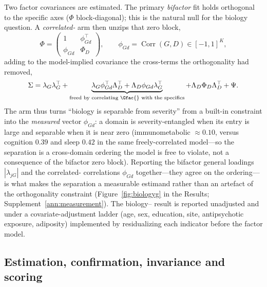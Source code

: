 Two factor covariances are estimated. The primary \emph{bifactor} fit holds \Gfac{}
orthogonal to the specific axes ($\Phi$ block-diagonal); this is the natural null for the
biology question. A \emph{correlated-\Gfac{}} arm then unzips that zero block,
\begin{equation}
  \Phi=\begin{pmatrix}1 & \phi_{Gd}^{\top}\\[2pt] \phi_{Gd} & \Phi_D\end{pmatrix},
  \qquad \phi_{Gd}=\operatorname{Corr}(G,D)\in[-1,1]^{K},
  \label{eq:corrg}
\end{equation}
adding to the model-implied covariance the cross-terms the orthogonality had removed,
\begin{equation}
  \Sigma=\lambda_G\lambda_G^{\top}
  +\underbrace{\lambda_G\phi_{Gd}^{\top}\Lambda_D^{\top}+\Lambda_D\phi_{Gd}\lambda_G^{\top}}_{\text{freed by correlating }\Gfac{}\text{ with the specifics}}
  +\Lambda_D\Phi_D\Lambda_D^{\top}+\Psi .
  \label{eq:m-corrgsigma}
\end{equation}
The arm thus turns ``biology is separable from severity'' from a built-in constraint into the
\emph{measured} vector $\phi_{Gd}$: a domain is severity-entangled when its entry is
large and separable when it is near zero (immunometabolic $\approx 0.10$, versus cognition
$0.39$ and sleep $0.42$ in the same freely-correlated model---so the separation is a cross-domain ordering
the model is free to violate, not a consequence of the bifactor zero block). Reporting the bifactor general loadings
$|\lambda_{jG}|$ and the correlated-\Gfac{} correlations $\phi_{Gd}$ together---they
agree on the ordering---is what makes the separation a measurable estimand rather than an
artefact of the orthogonality constraint (Figure~\ref{fig:biologyg} in the Results;
Supplement~\ref{ann:measurement}). The biology--\Gfac{} result is reported unadjusted and
under a covariate-adjustment ladder (age, sex, education, site, antipsychotic exposure,
adiposity) implemented by residualizing each indicator before the factor model.

\subsection{Estimation, confirmation, invariance and scoring}

